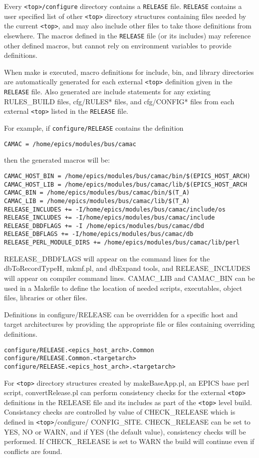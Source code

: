 Every \verb|<top>/configure| directory contains a \verb|RELEASE| file. \verb|RELEASE| contains a user specified list of other \verb|<top>| 
directory structures containing files needed by the current \verb|<top>|, and may also include other files to take those definitions 
from elsewhere. The macros defined in the \verb|RELEASE| file (or its includes) may reference other defined macros, but 
cannot rely on environment variables to provide definitions.

When make is executed, macro definitions for include, bin, and library directories are automatically generated for each 
external \verb|<top>| definition given in the \verb|RELEASE| file. Also generated are include statements for any existing 
RULES\_BUILD files, cfg/RULES* files, and cfg/CONFIG* files from each external \verb|<top>| listed in the \verb|RELEASE| file.

For example, if \verb|configure/RELEASE| contains the definition
\begin{verbatim}
CAMAC = /home/epics/modules/bus/camac
\end{verbatim}
then the generated macros will be:
\begin{verbatim}
CAMAC_HOST_BIN = /home/epics/modules/bus/camac/bin/$(EPICS_HOST_ARCH)
CAMAC_HOST_LIB = /home/epics/modules/bus/camac/lib/$(EPICS_HOST_ARCH
CAMAC_BIN = /home/epics/modules/bus/camac/bin/$(T_A)
CAMAC_LIB = /home/epics/modules/bus/camac/lib/$(T_A)
RELEASE_INCLUDES += -I/home/epics/modules/bus/camac/include/os
RELEASE_INCLUDES += -I/home/epics/modules/bus/camac/include
RELEASE_DBDFLAGS += -I /home/epics/modules/bus/camac/dbd
RELEASE_DBFLAGS += -I/home/epics/modules/bus/camac/db
RELEASE_PERL_MODULE_DIRS += /home/epics/modules/bus/camac/lib/perl
\end{verbatim}

RELEASE\_DBDFLAGS will appear on the command lines for the dbToRecordTypeH, mkmf.pl, and dbExpand tools, 
and 
RELEASE\_INCLUDES will appear on compiler command lines. CAMAC\_LIB and CAMAC\_BIN can be used in a 
Makefile to define the location of needed scripts, executables, object files, libraries or other files.

Definitions in configure/RELEASE can be overridden for a specific host and target architectures by providing the 
appropriate file or files containing overriding definitions.
\begin{verbatim}
configure/RELEASE.<epics_host_arch>.Common
configure/RELEASE.Common.<targetarch>
configure/RELEASE.<epics_host_arch>.<targetarch>
\end{verbatim}
For \verb|<top>| directory structures created by makeBaseApp.pl, an EPICS base perl script, convertRelease.pl can perform 
consistency checks for the external \verb|<top>| definitions in the RELEASE file and its includes as part of the \verb|<top>| level 
build. Consistancy checks are controlled by value of CHECK\_RELEASE which is defined in \verb|<top>|/configure/
CONFIG\_SITE. CHECK\_RELEASE can be set to YES, NO or WARN, and if YES (the default value), consistency 
checks will be performed. If CHECK\_RELEASE is set to WARN the build will continue even if conflicts are found.

